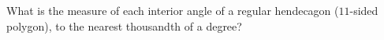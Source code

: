 What is the measure of each interior angle of a regular hendecagon ($11$-sided polygon), to the nearest thousandth of a degree?
